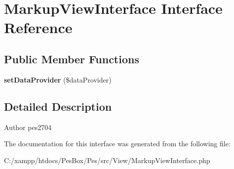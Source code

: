 \hypertarget{interface_pes_1_1_view_1_1_markup_view_interface}{}\section{Markup\+View\+Interface Interface Reference}
\label{interface_pes_1_1_view_1_1_markup_view_interface}
\subsection*{Public Member Functions}
\begin{DoxyCompactItemize}
\item 
\mbox{\label{interface_pes_1_1_view_1_1_markup_view_interface_a2b2e8e49462a5914db446de6ffc6dbf1}} 
{\bfseries set\+Data\+Provider} (\$data\+Provider)
\end{DoxyCompactItemize}


\subsection{Detailed Description}
\begin{DoxyAuthor}{Author}
pes2704 
\end{DoxyAuthor}


The documentation for this interface was generated from the following file\+:\begin{DoxyCompactItemize}
\item 
C\+:/xampp/htdocs/\+Pes\+Box/\+Pes/src/\+View/Markup\+View\+Interface.\+php\end{DoxyCompactItemize}
